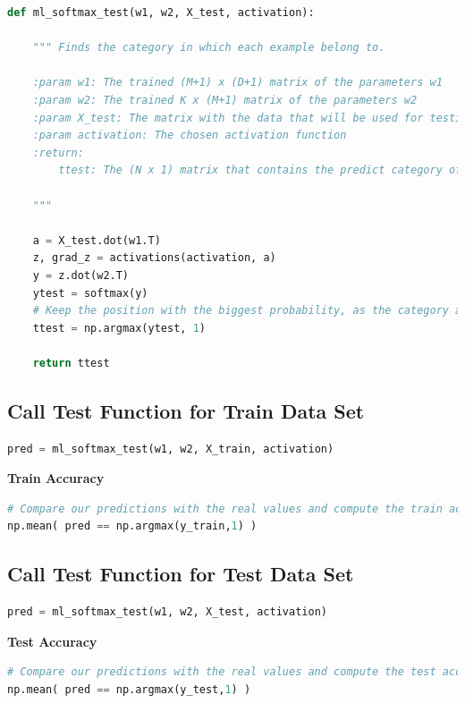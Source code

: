 \documentclass[11pt]{article}
\begin{document}
\begin{lstlisting}[language = Python]
def ml_softmax_test(w1, w2, X_test, activation):
    
    """ Finds the category in which each example belong to.
    
    :param w1: The trained (M+1) x (D+1) matrix of the parameters w1
    :param w2: The trained K x (M+1) matrix of the parameters w2
    :param X_test: The matrix with the data that will be used for testing
    :param activation: The chosen activation function
    :return:
        ttest: The (N x 1) matrix that contains the predict category of each example
    
    """
    
    a = X_test.dot(w1.T)
    z, grad_z = activations(activation, a)
    y = z.dot(w2.T)
    ytest = softmax(y)
    # Keep the position with the biggest probability, as the category a test example belongs to
    ttest = np.argmax(ytest, 1)
    
    return ttest
\end{lstlisting}


\subsection{Call Test Function for Train Data Set}

\begin{lstlisting}[language = Python]
pred = ml_softmax_test(w1, w2, X_train, activation)
\end{lstlisting}


\noindent \textbf{Train Accuracy}
\begin{lstlisting}[language = Python]
# Compare our predictions with the real values and compute the train accuracy of the model
np.mean( pred == np.argmax(y_train,1) )
\end{lstlisting}
\newpage

\subsection{Call Test Function for Test Data Set}

\begin{lstlisting}[language = Python]
pred = ml_softmax_test(w1, w2, X_test, activation)
\end{lstlisting} 
\hfill

\noindent \textbf{Test Accuracy}
\begin{lstlisting}[language = Python]
# Compare our predictions with the real values and compute the test accuracy of the model
np.mean( pred == np.argmax(y_test,1) )
\end{lstlisting}
\end{document}
